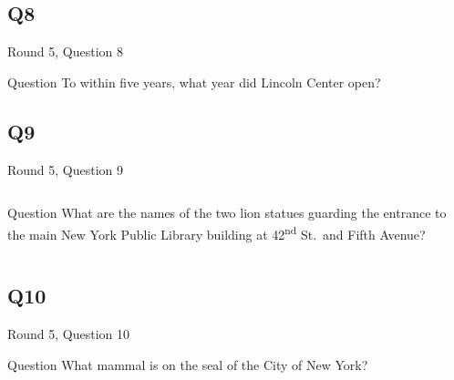 \documentclass[11pt]{beamer}
\begin{document}
\subsection*{Q8}
\begin{frame}[t]{Round 5, Question 8}
\begin{block}{Question}
To within five years, what year did Lincoln Center open?
\end{block}
\end{frame}
\subsection*{Q9}
\begin{frame}[t]{Round 5, Question 9}
\begin{columns}[T,totalwidth=\linewidth]
\begin{column}{0.32\linewidth}
\begin{block}{Question}
What are the names of the two lion statues guarding the entrance to the main New York Public Library building at 42\textsuperscript{nd} St.\ and Fifth Avenue?
\end{block}
\end{column}
\begin{column}{0.65\linewidth}
\begin{center}
\texttt{[image: \{Images/nypl]}.jpg}
\end{center}
\end{column}
\end{columns}
\end{frame}
\subsection*{Q10}
\begin{frame}[t]{Round 5, Question 10}
\begin{block}{Question}
What mammal is on the seal of the City of New York?
\end{block}
\end{frame}
\end{document}
